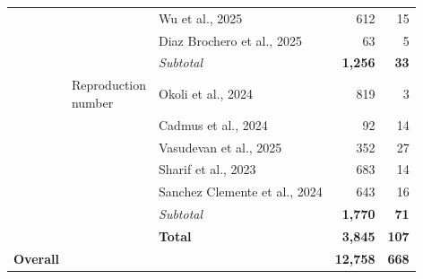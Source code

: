 \begin{table}[H]
\begin{tabular}{>{\centering\arraybackslash}p{}>{\centering\arraybackslash}p{}p{}rr}
 &  & Wu et al., 2025 & 612 & 15 \\
 &  & Diaz Brochero et al., 2025 & 63 & 5 \\
 &  & \textit{Subtotal} & \textbf{1,256} & \textbf{33} \\
\cmidrule(lr){2-5}
 & \makecell[c]{Reproduction\\number} & Okoli et al., 2024 & 819 & 3 \\
\cmidrule(lr){2-5}
 & \multirow[c]{4}{0.18\textwidth}{\centering Fatality} & Cadmus et al., 2024 & 92 & 14 \\
 &  & Vasudevan et al., 2025 & 352 & 27 \\
 &  & Sharif et al., 2023 & 683 & 14 \\
 &  & Sanchez Clemente et al., 2024 & 643 & 16 \\
 &  & \textit{Subtotal} & \textbf{1,770} & \textbf{71} \\
\cmidrule(lr){2-5}
 &  & \textbf{Total} & \textbf{3,845} & \textbf{107} \\
\midrule
\textbf{Overall} &  &  & \textbf{12,758} & \textbf{668} \\
\bottomrule
\end{tabular}
\end{table}
